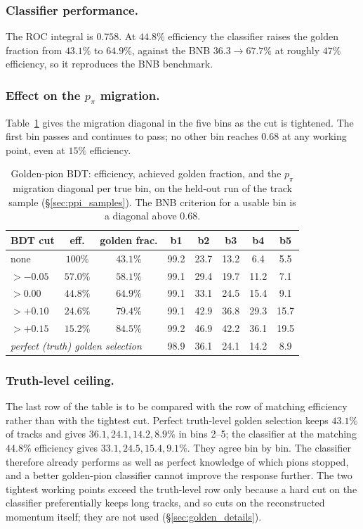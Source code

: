 \documentclass[11pt,a4paper]{article}
\begin{document}
\subsubsection{Classifier performance.} The ROC integral is $0.758$. At
$44.8\%$ efficiency the classifier raises the golden fraction from $43.1\%$ to $64.9\%$,
against the BNB $36.3\to67.7\%$ at roughly $47\%$ efficiency, so it reproduces the BNB
benchmark.

\subsubsection{Effect on the $p_\pi$ migration.} Table~\ref{tab:golden_compare}
gives the migration diagonal in the five bins as the cut is tightened. The first bin
passes and continues to pass; no other bin reaches $0.68$ at any working point, even at
$15\%$ efficiency.

\begin{table}[htbp]\centering
\caption{Golden-pion BDT: efficiency, achieved golden fraction, and the $p_\pi$ migration
  diagonal per true bin, on the held-out run of the track sample (\S\ref{sec:ppi_samples}). The
  BNB criterion for a usable bin is a
  diagonal above $0.68$.}
\label{tab:golden_compare}
\begin{tabular}{lccccccc}
\toprule
BDT cut & eff. & golden frac. & b1 & b2 & b3 & b4 & b5 \\\midrule
none      & $100\%$  & $43.1\%$ & 99.2 & 23.7 & 13.2 & 6.4 & 5.5 \\
$>-0.05$  & $57.0\%$ & $58.1\%$ & 99.1 & 29.4 & 19.7 & 11.2 & 7.1 \\
$>0.00$   & $44.8\%$ & $64.9\%$ & 99.1 & 33.1 & 24.5 & 15.4 & 9.1 \\
$>+0.10$  & $24.6\%$ & $79.4\%$ & 99.1 & 42.9 & 36.8 & 29.3 & 15.7 \\
$>+0.15$  & $15.2\%$ & $84.5\%$ & 99.2 & 46.9 & 42.2 & 36.1 & 19.5 \\\midrule
\multicolumn{3}{l}{\emph{perfect (truth) golden selection}} & 98.9 & 36.1 & 24.1 & 14.2 & 8.9 \\
\bottomrule
\end{tabular}
\end{table}

\subsubsection{Truth-level ceiling.}
The last row of the table is to be compared with the row of matching efficiency rather than
with the tightest cut. Perfect truth-level golden selection keeps $43.1\%$ of
tracks and gives $36.1, 24.1, 14.2, 8.9\%$ in bins 2--5; the classifier at the matching
$44.8\%$ efficiency gives $33.1, 24.5, 15.4, 9.1\%$. They agree bin by bin. The classifier
therefore already performs as well as perfect knowledge of which pions stopped, and a
better golden-pion classifier cannot improve the response further.
The two tightest working points exceed the truth-level row only because a hard cut on the classifier
preferentially keeps long tracks, and so cuts on the reconstructed momentum itself; they are not used
(\S\ref{sec:golden_details}).
\end{document}
